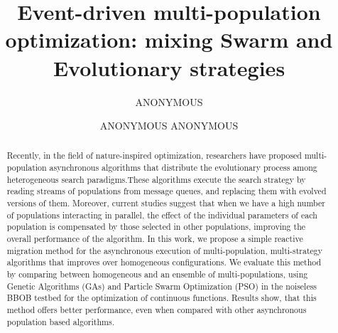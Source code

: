 \documentclass[sigconf]{acmart}
\begin{document}
\title{Event-driven multi-population optimization: mixing Swarm and Evolutionary strategies}

\author{ANONYMOUS}


\author{ANONYMOUS ANONYMOUS}




\renewcommand{\shortauthors}{ANONYMOUS et al.}

\begin{abstract}
  Recently, in the field of nature-inspired optimization, 
  researchers have proposed multi-population asynchronous 
  algorithms that distribute the evolutionary process among 
  heterogeneous search paradigms.These algorithms execute 
  the search strategy by reading streams of populations 
  from message queues, and replacing them with evolved versions of them.
  Moreover, current studies suggest that when we have a high number of populations
  interacting in parallel, the effect of the individual parameters
  of each population is compensated by those selected in other
  populations, 
  improving the overall performance of the algorithm. In this work,
  we propose a simple reactive migration method for the 
  asynchronous execution of multi-population, multi-strategy 
  algorithms that improves over homogeneous configurations.
  We evaluate this method by comparing between %
  homogeneous and an ensemble of 
  multi-populations, using Genetic Algorithms (GAs) and Particle 
  Swarm Optimization (PSO) in the noiseless BBOB testbed for 
  the optimization of continuous functions. Results show,
  that this method offers better performance, even when compared
  with other asynchronous population based algorithms. 
\end{abstract}
\end{document}
